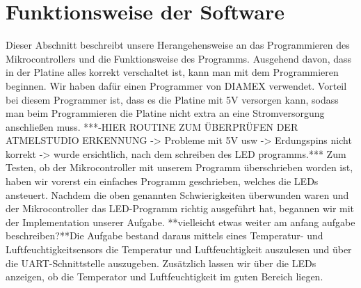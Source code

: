 \documentclass[]{article}
\begin{document}
\section{Funktionsweise der Software}
Dieser Abschnitt beschreibt unsere Herangehensweise an das Programmieren des Mikrocontrollers und die Funktionsweise des Programms. Ausgehend davon, dass in der Platine alles korrekt verschaltet ist, kann man mit dem Programmieren beginnen. Wir haben dafür einen Programmer von DIAMEX verwendet. Vorteil bei diesem Programmer ist, dass es die Platine mit 5V versorgen kann, sodass man beim Programmieren die Platine nicht extra an eine Stromversorgung anschließen muss. 
***-HIER ROUTINE ZUM ÜBERPRÜFEN DER ATMELSTUDIO ERKENNUNG -> Probleme mit 5V usw -> Erdungspins nicht korrekt -> wurde ersichtlich, nach dem schreiben des LED programms.***
Zum Testen, ob der Mikrocontroller mit unserem Programm überschrieben worden ist, haben wir vorerst ein einfaches Programm geschrieben, welches die LEDs ansteuert. Nachdem die oben genannten Schwierigkeiten überwunden waren und der Mikrocontroller das LED-Programm richtig ausgeführt hat, begannen wir mit der Implementation unserer Aufgabe. **vielleicht etwas weiter am anfang aufgabe beschreiben?**Die Aufgabe bestand daraus mittels eines Temperatur- und Luftfeuchtigkeitsensors die Temperatur und Luftfeuchtigkeit auszulesen und über die UART-Schnittstelle auszugeben. Zusätzlich lassen wir über die LEDs anzeigen, ob die Temperator und Luftfeuchtigkeit im guten Bereich liegen. 
\end{document}
